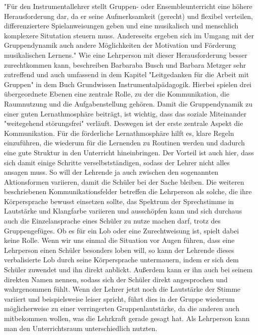 "Für den Instrumentallehrer stellt Gruppen- oder Ensembleunterricht eine höhere
Herausforderung dar, da er seine Aufmerksamkeit (gerecht) und flexibel
verteilen, differenziertere Spielanweisungen geben und eine musikalisch und
menschlich komplexere Situtation steuern muss. Andereseits ergeben sich im Umgang
mit der Gruppendynamik auch andere Möglichkeiten der Motivation und Förderung
musikalischen Lernens." %
Wie eine
Lehrperson mit dieser Herausforderung besser zurechtkommen kann, beschreiben
Barbaraba Busch und Barbara Metzger sehr zutreffend und auch umfassend in dem
Kapitel "Leitgedanken für die Arbeit mit Gruppen" in dem Buch Grundwissen
Instrumentalpädagogik. Hierbei spielen drei übergeordnete Ebenen eine
zentrale Rolle, zu der die Kommunikation, die Raumnutzung und die
Aufgabenstellung gehören. Damit die Gruppendynamik zu einer guten
Lernathmosphäre beiträgt, ist wichtig, dass das soziale Miteinander "weitegehend
störungsfrei" verläuft. Deswegen ist der erste zentrale Aspekt die
Kommunikation. Für die förderliche Lernathmosphäre hilft es, klare Regeln
einzuführen, die wiederum für die Lernenden zu Routinen werden und dadurch eine
gute Struktur in den Unterricht hineinbringen. Der Vorteil ist auch hier, dass
sich damit einige Schritte verselbstständigen, sodass der Lehrer nicht alles
ansagen muss. So will der Lehrende ja auch zwischen den sogenannten
Aktionsformen variieren, damit die Schüler bei der Sache bleiben. Die weiteren
beschriebenen Kommunikationsfelder betreffen die Lehrperson als solche, die ihre
Körpersprache bewusst einsetzen sollte, das Spektrum der Sprechstimme in
Lautstärke und Klangfarbe variieren und ausschöpfen kann und sich durchaus auch
die Einzelansprache eines Schüler zu nutze machen darf, trotz des
Gruppengefüges. Ob es für ein Lob oder eine Zurechtweisung ist, spielt dabei
keine Rolle. Wenn wir uns einmal die Situation vor Augen führen, dass eine
Lehrperson einen Schüler besonders loben will, so kann der Lehrende dieses
verbalisierte Lob durch seine Körpersprache untermauern, indem er sich dem
Schüler zuwendet und ihn direkt anblickt. Außerdem kann er ihn auch bei
seinem direkten Namen nennen, sodass sich der Schüler direkt angesprochen und
wahrgenommen fühlt. Wenn der Lehrer jetzt noch die Lautstärke der Stimme
variiert und beispielsweise leiser spricht, führt dies in der Gruppe wiederum
möglicherweise zu einer verringerten Gruppenlautstärke, da die anderen auch
mitbekommen wollen, was die Lehrkraft gerade gesagt hat. Als Lehrperson kann man
den Unterrichtsraum unterschiedlich nutzten.
